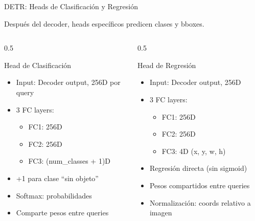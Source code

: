 \documentclass[aspectratio=169, 10pt]{beamer}
\begin{document}
\begin{frame}[shrink]{DETR: Heads de Clasificaci\'on y Regresi\'on}

	Despu\'es del decoder, heads espec\'ificos predicen clases y bboxes.

	\vspace{0.15cm}

	\begin{columns}[T]
		\begin{column}{0.5\textwidth}
			\begin{block}{Head de Clasificaci\'on}
				\small
				\begin{itemize}
					\item Input: Decoder output, 256D por query
					\item 3 FC layers:
					\begin{itemize}
						\item FC1: 256D
						\item FC2: 256D
						\item FC3: (num\_classes + 1)D
					\end{itemize}
					\item +1 para clase ``sin objeto''
					\item Softmax: probabilidades
					\item Comparte pesos entre queries
				\end{itemize}
			\end{block}
		\end{column}

		\begin{column}{0.5\textwidth}
			\begin{block}{Head de Regresi\'on}
				\small
				\begin{itemize}
					\item Input: Decoder output, 256D
					\item 3 FC layers:
					\begin{itemize}
						\item FC1: 256D
						\item FC2: 256D
						\item FC3: 4D (x, y, w, h)
					\end{itemize}
					\item Regresi\'on directa (sin sigmoid)
					\item Pesos compartidos entre queries
					\item Normalizaci\'on: coords relativo a imagen
				\end{itemize}
			\end{block}
		\end{column}
	\end{columns}

\end{frame}
\end{document}
